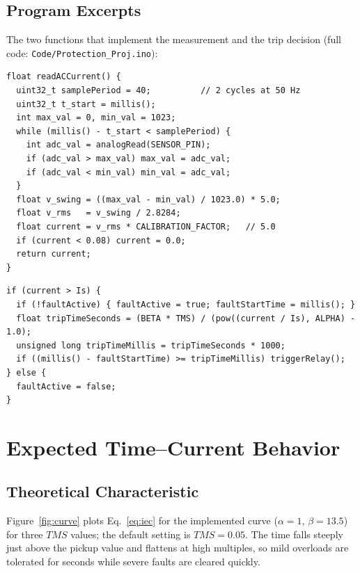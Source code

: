 \documentclass[12pt, a4paper]{article}
\begin{document}
\subsection{Program Excerpts}
The two functions that implement the measurement and the trip decision (full code: \texttt{Code/Protection\_Proj.ino}):
\begin{lstlisting}
float readACCurrent() {
  uint32_t samplePeriod = 40;          // 2 cycles at 50 Hz
  uint32_t t_start = millis();
  int max_val = 0, min_val = 1023;
  while (millis() - t_start < samplePeriod) {
    int adc_val = analogRead(SENSOR_PIN);
    if (adc_val > max_val) max_val = adc_val;
    if (adc_val < min_val) min_val = adc_val;
  }
  float v_swing = ((max_val - min_val) / 1023.0) * 5.0;
  float v_rms   = v_swing / 2.8284;
  float current = v_rms * CALIBRATION_FACTOR;   // 5.0
  if (current < 0.08) current = 0.0;
  return current;
}
\end{lstlisting}

\newpage

\begin{lstlisting}
if (current > Is) {
  if (!faultActive) { faultActive = true; faultStartTime = millis(); }
  float tripTimeSeconds = (BETA * TMS) / (pow((current / Is), ALPHA) - 1.0);
  unsigned long tripTimeMillis = tripTimeSeconds * 1000;
  if ((millis() - faultStartTime) >= tripTimeMillis) triggerRelay();
} else {
  faultActive = false;
}
\end{lstlisting}

\section{Expected Time--Current Behavior}
\subsection{Theoretical Characteristic}
Figure~\ref{fig:curve} plots Eq.~\eqref{eq:iec} for the implemented curve ($\alpha=1$, $\beta=13.5$) for three $TMS$ values; the default setting is $TMS = 0.05$. The time falls steeply just above the pickup value and flattens at high multiples, so mild overloads are tolerated for seconds while severe faults are cleared quickly.
\end{document}
